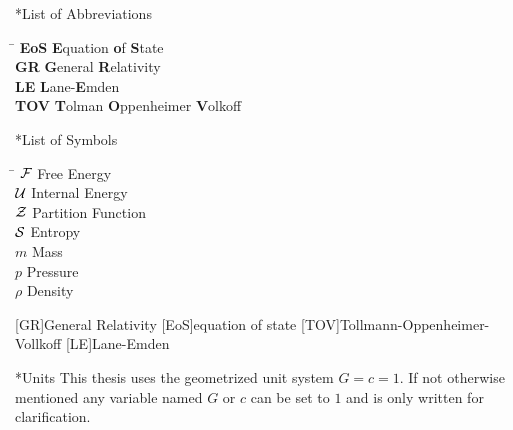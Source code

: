 \thispagestyle{empty}
\begin{section}*{List of Abbreviations}
\begin{tabbing}
\hspace{2cm}\= \kill
\textbf{EoS}        \> \textbf{E}quation \textbf{o}f \textbf{S}tate\\
\textbf{GR} 		\> \textbf{G}eneral \textbf{R}elativity \\
\textbf{LE}			\> \textbf{L}ane-\textbf{E}mden\\
\textbf{TOV}		\> \textbf {T}olman \textbf{O}ppenheimer \textbf{V}olkoff


\end{tabbing}


\end{section}
\begin{section}*{List of Symbols}
\begin{tabbing}
\hspace{2cm}\=\kill
$\mathcal{F}$				\> Free Energy\\
$\mathcal{U}$				\> Internal Energy\\
$\mathcal{Z}$				\> Partition Function\\
$\mathcal{S}$				\> Entropy\\
$m$					\> Mass\\
$p$					\> Pressure\\
$\rho$				\> Density
\end{tabbing}

\begin{acronym}[TOV]
	[GR]{General Relativity}
	[EoS]{equation of state}
	[TOV]{Tollmann-Oppenheimer-Vollkoff}
	[LE]{Lane-Emden}
\end{acronym}

\end{section}

\begin{section}*{Units}
This thesis uses the geometrized unit system $G=c=1$.
If not otherwise mentioned any variable named $G$ or $c$ can be set to $1$ and is only written for clarification.
\end{section}
